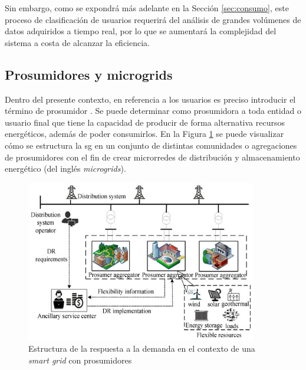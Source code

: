 \vspace{3mm}

Sin embargo, como se expondrá más adelante en la Sección \ref{sec:consumo}, este proceso de clasificación de usuarios requerirá del análisis de grandes volúmenes de datos adquiridos a tiempo real, por lo que se aumentará la complejidad del sistema a costa de alcanzar la eficiencia.

\vspace{1mm}

\subsection{Prosumidores y microgrids}
\label{sec:prosu}

Dentro del presente contexto, en referencia a los usuarios es preciso introducir el término de prosumidor \cite{prosumer}. Se puede determinar como prosumidora a toda entidad o usuario final que tiene la capacidad de producir de forma alternativa recursos energéticos, además de poder consumirlos. En la Figura \ref{fig:prosumer} se puede visualizar cómo se estructura la \gls{sg} en un conjunto de distintas comunidades o agregaciones de prosumidores con el fin de crear microrredes de distribución y almacenamiento energético (del inglés \textit{microgrids}).

\vspace{3mm}

\begin{figure}[h]
  \centering
  \includegraphics[width=0.9\textwidth]{img/teoria/prosumer.jpg}
  \caption{Estructura de la respuesta a la demanda en el contexto de una \textit{smart grid} con prosumidores \cite{prosumer}}
  \label{fig:prosumer}
\end{figure}

